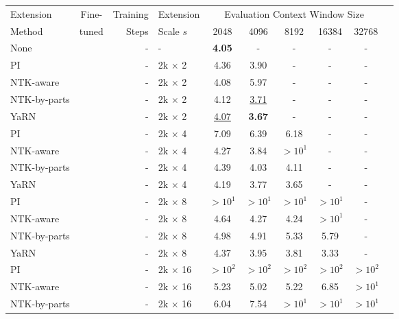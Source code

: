 \documentclass{article} %
\newcommand{\xmark}{\textcolor{red}{\ding{55}}}
\begin{document}
\begin{table}[h]
    \centering
    \begin{tabular}{lcrlcccccc}
        \toprule
         Extension & Fine-  & Training & Extension & \multicolumn{5}{c}{Evaluation Context Window Size}  \\
         Method    & tuned  &  Steps   & Scale $s$ & 2048 & 4096 & 8192 & 16384 & 32768\\
        \midrule
        None        & \xmark &  - & -             & \textbf{4.05} & - & - & - & - \\
        \midrule
        PI           & \xmark &   -  & 2k $\times$ 2 & 4.36 & 3.90 & - & - & - \\
        NTK-aware    & \xmark &   -  & 2k $\times$ 2 & 4.08 & 5.97 & - & - & - \\
        NTK-by-parts & \xmark &   -  & 2k $\times$ 2 & 4.12 & \underline{3.71} & - & - & - \\
        YaRN         & \xmark &   -  & 2k $\times$ 2 & \underline{4.07} & \textbf{3.67} & - & - & - \\
        \midrule
        PI           & \xmark &   -  & 2k $\times$ 4 & 7.09 & 6.39 & 6.18 & - & - \\
        NTK-aware    & \xmark &   -  & 2k $\times$ 4 & 4.27 & 3.84 & $>10^1$ & - & - \\
        NTK-by-parts & \xmark &   -  & 2k $\times$ 4 & 4.39 & 4.03 & 4.11 & - & - \\
        YaRN         & \xmark &   -  & 2k $\times$ 4 & 4.19 & 3.77 & 3.65 & - & - \\
        \midrule
        PI           & \xmark &   -  & 2k $\times$ 8 & $>10^1$ & $>10^1$ & $>10^1$ & $>10^1$ & - \\
        NTK-aware    & \xmark &   -  & 2k $\times$ 8 & 4.64 & 4.27 & 4.24 & $>10^1$ & - \\
        NTK-by-parts & \xmark &   -  & 2k $\times$ 8 & 4.98 & 4.91 & 5.33 & 5.79 & - \\
        YaRN         & \xmark &   -  & 2k $\times$ 8 & 4.37 & 3.95 & 3.81 & 3.33 & - \\
        \midrule
        PI           & \xmark &   -  & 2k $\times$ 16 & $>10^2$ & $>10^2$ & $>10^2$ & $>10^2$ & $>10^2$ \\
        NTK-aware    & \xmark &   -  & 2k $\times$ 16 & 5.23 & 5.02 & 5.22 & 6.85 & $>10^1$ \\
        NTK-by-parts & \xmark &   -  & 2k $\times$ 16 & 6.04 & 7.54 & $>10^1$ & $>10^1$ & $>10^1$ \\

\end{tabular}
\end{table}
\end{document}
